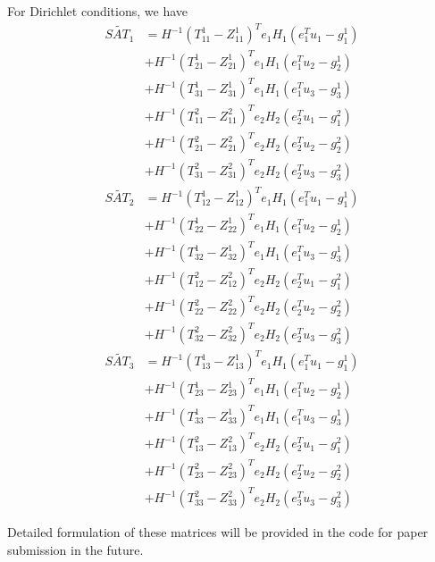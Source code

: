 For Dirichlet conditions, we have
\begin{align}
    \tilde{SAT_1} &= H^{-1} (T_{11}^1 - Z_{11}^1)^T e_1 H_1 (e_1^T u_1 - g_1^1) \nonumber \\
    &+ H^{-1} (T_{21}^1 - Z_{21}^1)^T e_1 H_1 (e_1^T u_2 - g_2^1) \nonumber\\ 
    &+ H^{-1} (T_{31}^1 - Z_{31}^1)^T e_1 H_1 (e_1^T u_3 - g_3^1) \nonumber\\
    &+ H^{-1} (T_{11}^2 - Z_{11}^2)^T e_2 H_2 (e_2^T u_1 - g_1^2) \nonumber\\
    &+ H^{-1} (T_{21}^2 - Z_{21}^2)^T e_2 H_2 (e_2^T u_2 - g_2^2) \nonumber\\
    &+ H^{-1} (T_{31}^2 - Z_{31}^2)^T e_2 H_2 (e_2^T u_3 - g_3^2) \\
    \tilde{SAT_2} &= H^{-1} (T_{12}^1 - Z_{12}^1)^T e_1 H_1 (e_1^T u_1 - g_1^1) \nonumber \\
    & + H^{-1} (T_{22}^1 - Z_{22}^1)^T e_1 H_1 (e_1^T u_2 - g_2^1) \nonumber \\
    & + H^{-1} (T_{32}^1 - Z_{32}^1)^T e_1 H_1 (e_1^T u_3 - g_3^1) \nonumber \\
    & + H^{-1} (T_{12}^2 - Z_{12}^2)^T e_2 H_2 (e_2^T u_1 - g_1^2) \nonumber \\
    & + H^{-1} (T_{22}^2 - Z_{22}^2)^T e_2 H_2 (e_2^T u_2 - g_2^2) \nonumber \\ 
    & + H^{-1} (T_{32}^2 - Z_{32}^2)^T e_2 H_2 (e_2^T u_3 - g_3^2) \\
    \tilde{SAT_3} &= H^{-1} (T_{13}^1 - Z_{13}^1)^T e_1 H_1 (e_1^T u_1 - g_1^1) \nonumber \\
    & + H^{-1} (T_{23}^1 - Z_{23}^1)^T e_1 H_1 (e_1^T u_2 - g_2^1) \nonumber \\ 
    & + H^{-1} (T_{33}^1 - Z_{33}^1)^T e_1 H_1 (e_1^T u_3 - g_3^1) \nonumber \\
    & + H^{-1} (T_{13}^2 - Z_{13}^2)^T e_2 H_2 (e_2^T u_1 - g_1^2) \nonumber \\
    & + H^{-1} (T_{23}^2 - Z_{23}^2)^T e_2 H_2 (e_2^T u_2 - g_2^2) \nonumber \\
    & + H^{-1} (T_{33}^2 - Z_{33}^2)^T e_2 H_2 (e_3^T u_3 - g_3^2)
    \label{eqn:dirichlet-condition}
\end{align}

Detailed formulation of these matrices will be provided in the code for paper submission in the future.


